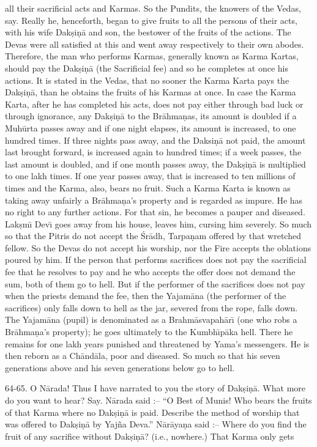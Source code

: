 all their sacrificial acts and Karmas. So the Pundits, the knowers of the Vedas, say. Really he, henceforth, began to give fruits to all the persons of their acts, with his wife Dak\d{s}i\d{n}\=a and son, the bestower of the fruits of the actions. The Devas were all satisfied at this and went away respectively to their own abodes. Therefore, the man who performs Karmas, generally known as Karma Kartas, should pay the Dak\d{s}i\d{n}\=a (the Sacrificial fee) and so he completes at once his actions. It is stated in the Vedas, that no sooner the Karma Karta pays the Dak\d{s}i\d{n}\=a, than he obtains the fruits of his Karmas at once. In case the Karma Karta, after he has completed his acts, does not pay either through bad luck or through ignorance, any Dak\d{s}i\d{n}\=a to the Br\=ahma\d{n}as, its amount is doubled if a Muh\=urta passes away and if one night elapses, its amount is increased, to one hundred times. If three nights pass away, and the Daksi\d{n}\=a not paid, the amount last brought forward, is increased again to hundred times; if a week passes, the last amount is doubled, and if one month passes away, the Dak\d{s}i\d{n}\=a is multiplied to one lakh times. If one year passes away, that is increased to ten millions of times and the Karma, also, bears no fruit. Such a Karma Karta is known as taking away unfairly a Br\=ahma\d{n}a's property and is regarded as impure. He has no right to any further actions. For that sin, he becomes a pauper and diseased. Lak\d{s}m\={\i} Dev\={\i} goes away from his house, leaves him, cursing him severely. So much so that the Pitris do not accept the \'Sr\=adh, Tarpa\d{n}am offered by that wretched fellow. So the Devas do not accept his worship, nor the Fire accepts the oblations poured by him. If the person that performs sacrifices does not pay the sacrificial fee that he resolves to pay and he who accepts the offer does not demand the sum, both of them go to hell. But if the performer of the sacrifices does not pay when the priests demand the fee, then the Yajam\=ana (the performer of the sacrifices) only falls down to hell as the jar, severed from the rope, falls down. The Yajam\=ana (pupil) is denominated as a Brahm\=asvapah\=ar\={\i} (one who robs a Br\=ahma\d{n}a's property); he goes ultimately to the Kumbh\={\i}p\=aka hell. There he remains for one lakh years punished and threatened by Yama's messengers. He is then reborn as a Ch\=and\=ala, poor and diseased. So much so that his seven generations above and his seven
generations below go to hell.

64-65. O N\=arada! Thus I have narrated to you the story of Dak\d{s}i\d{n}\=a. What more do you want to hear? Say. N\=arada said :-- ``O Best of Munis! Who bears the fruits of that Karma where no Dak\d{s}i\d{n}\=a is paid. Describe the method of worship that was offered to Dak\d{s}i\d{n}\=a by Yaj\~na Deva.'' N\=ar\=aya\d{n}a said :-- Where do you find the fruit of any sacrifice without Dak\d{s}i\d{n}\=a? (i.e., nowhere.) That Karma only gets

